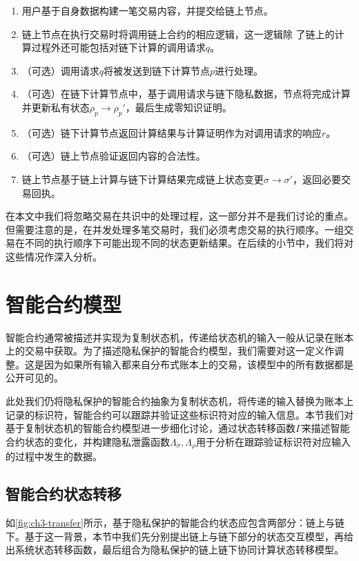 \begin{enumerate}
    \setlength{\itemsep}{0pt}
    \setlength{\parsep}{0pt}
    \setlength{\parskip}{0pt}
\item 用户基于自身数据构建一笔交易内容，并提交给链上节点。
\item 链上节点在执行交易时将调用链上合约的相应逻辑，这一逻辑除 了链上的计算过程外还可能包括对链下计算的调用请求$\mathit{q}$。
\item （可选）调用请求$\mathit{q}$将被发送到链下计算节点$\mathit{p}$进行处理。
\item （可选）在链下计算节点中，基于调用请求与链下隐私数据，节点将完成计算并更新私有状态$\rho_\mathit{p}\rightarrow\rho_\mathit{p}'$，最后生成零知识证明。
\item （可选）链下计算节点返回计算结果与计算证明作为对调用请求的响应$\mathit{r}$。
\item （可选）链上节点验证返回内容的合法性。
\item 链上节点基于链上计算与链下计算结果完成链上状态变更$\sigma\rightarrow\sigma'$，返回必要交易回执。
\end{enumerate}

在本文中我们将忽略交易在共识中的处理过程，这一部分并不是我们讨论的重点。但需要注意的是，在并发处理多笔交易时，我们必须考虑交易的执行顺序。一组交易在不同的执行顺序下可能出现不同的状态更新结果。在后续的小节中，我们将对这些情况作深入分析。
\section{智能合约模型}
智能合约通常被描述并实现为复制状态机，传递给状态机的输入一般从记录在账本上的交易中获取。为了描述隐私保护的智能合约模型，我们需要对这一定义作调整。这是因为如果所有输入都来自分布式账本上的交易，该模型中的所有数据都是公开可见的。

此处我们仍将隐私保护的智能合约抽象为复制状态机，将传递的输入替换为账本上记录的标识符，智能合约可以跟踪并验证这些标识符对应的输入信息。本节我们对基于复制状态机的智能合约模型进一步细化讨论，通过状态转移函数$\Gamma$来描述智能合约状态的变化，并构建隐私泄露函数$\Lambda_\sigma, \Lambda_\rho$用于分析在跟踪验证标识符对应输入的过程中发生的数据。
\subsection{智能合约状态转移}
如\autoref{fig:ch3-transfer}所示，基于隐私保护的智能合约状态应包含两部分：链上与链下。基于这一背景，本节中我们先分别提出链上与链下部分的状态交互模型，再给出系统状态转移函数，最后组合为隐私保护的链上链下协同计算状态转移模型。


